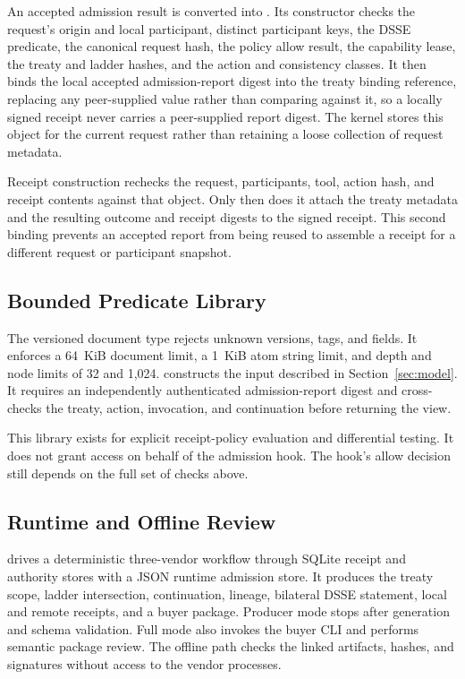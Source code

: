 An accepted admission result is converted into
. Its constructor checks the
request's origin and local participant, distinct participant keys, the DSSE
predicate, the canonical request hash, the policy allow result, the capability
lease, the treaty and ladder hashes, and the action and consistency classes.
It then binds the local accepted admission-report digest into the treaty
binding reference, replacing any peer-supplied value rather than comparing
against it, so a locally signed receipt never carries a peer-supplied report
digest. The kernel stores this object for the current request rather than
retaining a loose collection of request metadata.

Receipt construction rechecks the request, participants, tool, action hash,
and receipt contents against that object. Only then does it attach the treaty
metadata and the resulting outcome and receipt digests to the signed receipt.
This second binding prevents an accepted report from being reused to assemble
a receipt for a different request or participant snapshot.

\subsection{Bounded Predicate Library}

The versioned document type
 rejects unknown
versions, tags, and fields. It enforces a 64~KiB document limit, a 1~KiB atom
string limit, and depth and node limits of 32 and 1,024.
 constructs the
input described in Section~\ref{sec:model}. It requires an independently
authenticated admission-report digest and cross-checks the treaty, action,
invocation, and continuation before returning the view.

This library exists for explicit receipt-policy evaluation and differential
testing. It does not grant access on behalf of the admission hook. The hook's
allow decision still depends on the full set of checks above.

\subsection{Runtime and Offline Review}

 drives a deterministic three-vendor
workflow through SQLite receipt and authority stores with a JSON runtime
admission store. It produces the treaty scope, ladder intersection,
continuation, lineage, bilateral DSSE statement, local and remote receipts,
and a buyer package. Producer mode stops after generation and schema
validation. Full mode also invokes the buyer CLI and performs semantic package
review. The offline  path checks the linked
artifacts, hashes, and signatures without access to the vendor processes.

